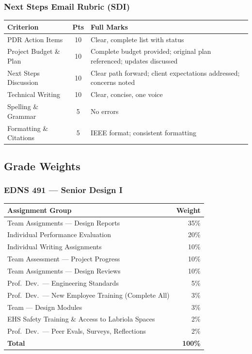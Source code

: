 \subsubsection{Next Steps Email Rubric (SDI)}
\label{sssec:rubric-next-steps}

{\small
\begin{longtable}{p{4cm} c p{5cm}}
\toprule
\textbf{Criterion} & \textbf{Pts} & \textbf{Full Marks} \\
\midrule
\endfirsthead
\bottomrule
\endfoot

PDR Action Items & 10 & Clear, complete list with status \\
\addlinespace
Project Budget \& Plan & 10 & Complete budget provided; original plan referenced; updates discussed \\
\addlinespace
Next Steps Discussion & 10 & Clear path forward; client expectations addressed; concerns noted \\
\addlinespace
Technical Writing & 10 & Clear, concise, one voice \\
\addlinespace
Spelling \& Grammar & 5 & No errors \\
\addlinespace
Formatting \& Citations & 5 & IEEE format; consistent formatting \\

\end{longtable}
}


\subsection{Grade Weights}
\label{subsec:grade-weights}

\subsubsection{EDNS 491 --- Senior Design I}

\begin{tabularx}{\textwidth}{Xr}
\toprule
\textbf{Assignment Group} & \textbf{Weight} \\
\midrule
Team Assignments --- Design Reports & 35\% \\
Individual Performance Evaluation & 20\% \\
Individual Writing Assignments & 10\% \\
Team Assessment --- Project Progress & 10\% \\
Team Assignments --- Design Reviews & 10\% \\
Prof.\ Dev.\ --- Engineering Standards & 5\% \\
Prof.\ Dev.\ --- New Employee Training (Complete All) & 3\% \\
Team --- Design Modules & 3\% \\
EHS Safety Training \& Access to Labriola Spaces & 2\% \\
Prof.\ Dev.\ --- Peer Evals, Surveys, Reflections & 2\% \\
\midrule
\textbf{Total} & \textbf{100\%} \\
\bottomrule
\end{tabularx}

